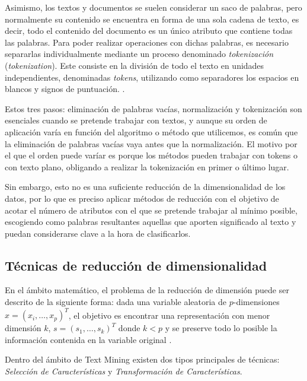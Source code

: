 \documentclass[10pt, a4paper]{article}
\begin{document}
Asimismo, los textos y documentos se suelen considerar un saco de palabras, pero normalmente su contenido se encuentra en forma de una sola cadena de texto, es decir, todo el contenido del documento es un único atributo que contiene todas las palabras. Para poder realizar operaciones con dichas palabras, es necesario separarlas individualmente mediante un proceso denominado \textit{tokenización} (\textit{tokenization}). Este consiste en la división de todo el texto en unidades independientes, denominadas \textit{tokens}, utilizando como separadores los espacios en blancos y signos de puntuación. \cite{TFG Jorge}.

Estos tres pasos: eliminación de palabras vacías, normalización y tokenización son esenciales cuando se pretende trabajar con textos, y aunque su orden de aplicación varía en función del algoritmo o método que utilicemos, es común que la eliminación de palabras vacías vaya antes que la normalización. El motivo por el que el orden puede varíar es porque los métodos pueden trabajar con tokens o con texto plano, obligando a realizar la tokenización en primer o último lugar. 

Sin embargo, esto no es una suficiente reducción de la dimensionalidad de los datos, por lo que es preciso aplicar métodos de reducción con el objetivo de acotar el número de atributos con el que se pretende trabajar al mínimo posible, escogiendo como palabras resultantes aquellas que aporten significado al texto y puedan considerarse clave a la hora de clasificarlos.


\subsection{Técnicas de reducción de dimensionalidad}

En el ámbito matemático, el problema de la reducción de dimensión puede ser descrito de la siguiente forma: dada una variable aleatoria de $p$-dimensiones $x = \left(x_i, \ldots, x_p \right)^T$, el objetivo es encontrar una representación con menor dimensión $k$, $s=\left( s_1, \ldots, s_k\right)^T$ donde $k < p$ y se preserve todo lo posible la información contenida en la variable original \cite{Document Representation and Dimension Reduction for Text Clustering}. 

Dentro del ámbito de Text Mining existen dos tipos principales de técnicas: \textit{Selección de Características} y \textit{Transformación de Características}.
\end{document}
